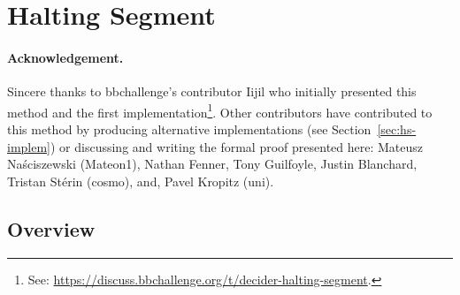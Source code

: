 
\newcommand{\HS}{Halting Segment\xspace}

\section{Halting Segment}\label{sec:halting-segment}

\paragraph{Acknowledgement.} Sincere thanks to bbchallenge's contributor Iijil who initially presented this method and the first implementation\footnote{See: \url{https://discuss.bbchallenge.org/t/decider-halting-segment}.}. Other contributors have contributed to this method by producing alternative implementations (see Section~\ref{sec:hs-implem}) or discussing and writing the formal proof presented here: Mateusz Naściszewski (Mateon1), Nathan Fenner, Tony Guilfoyle, Justin Blanchard, Tristan Stérin (cosmo), and, Pavel Kropitz (uni).

\subsection{Overview}

